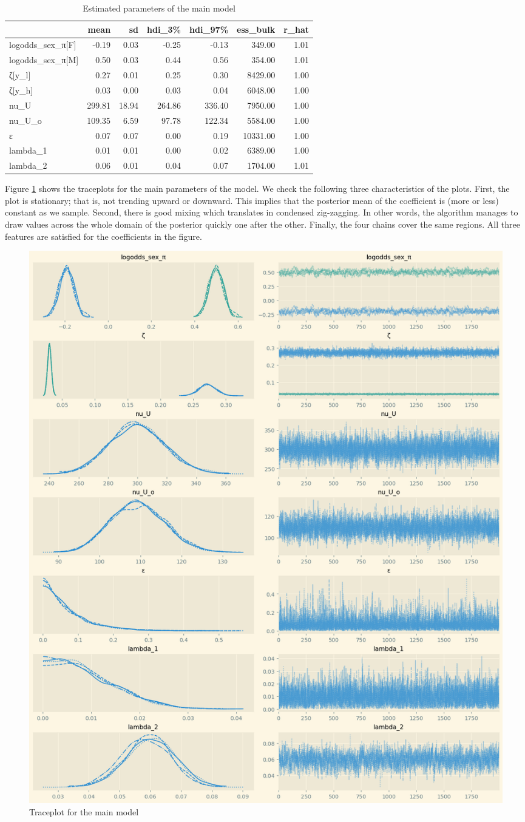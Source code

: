 \documentclass[a4paper,12pt]{article}
\begin{document}
\begin{table}[htbp]
\caption{\label{tab:rhat_main}Estimated parameters of the main model}
\centering
\begin{tabular}{lrrrrrr}
 & mean & sd & hdi\_3\% & hdi\_97\% & ess\_bulk & r\_hat\\
\hline
logodds\_sex\_π{[}F] & -0.19 & 0.03 & -0.25 & -0.13 & 349.00 & 1.01\\
logodds\_sex\_π{[}M] & 0.50 & 0.03 & 0.44 & 0.56 & 354.00 & 1.01\\
ζ[y\_l] & 0.27 & 0.01 & 0.25 & 0.30 & 8429.00 & 1.00\\
ζ[y\_h] & 0.03 & 0.00 & 0.03 & 0.04 & 6048.00 & 1.00\\
nu\_U & 299.81 & 18.94 & 264.86 & 336.40 & 7950.00 & 1.00\\
nu\_U\_o & 109.35 & 6.59 & 97.78 & 122.34 & 5584.00 & 1.00\\
ε & 0.07 & 0.07 & 0.00 & 0.19 & 10331.00 & 1.00\\
lambda\_1 & 0.01 & 0.01 & 0.00 & 0.02 & 6389.00 & 1.00\\
lambda\_2 & 0.06 & 0.01 & 0.04 & 0.07 & 1704.00 & 1.01\\
\end{tabular}
\end{table}


Figure \ref{fig:tracemain} shows the traceplots for the main parameters of the model. We check the following three characteristics of the plots. First, the plot is stationary; that is, not trending upward or downward. This implies that the posterior mean of the coefficient is (more or less) constant as we sample. Second, there is good mixing which translates in condensed zig-zagging. In other words, the algorithm manages to draw values across the whole domain of the posterior quickly one after the other. Finally, the four chains cover the same regions. All three features are satisfied for the coefficients in the figure.



\begin{figure}[htbp]
\centering
\includegraphics[width=.9\linewidth]{./figures/trace.png}
\caption{\label{fig:tracemain}Traceplot for the main model}
\end{figure}
\end{document}
